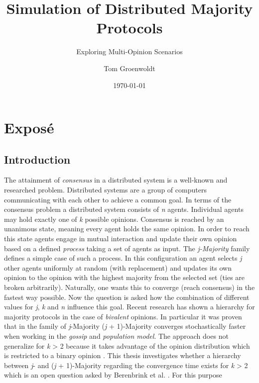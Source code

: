 \documentclass{thesis}
\title{Simulation of Distributed Majority Protocols}
\subtitle{Exploring Multi-Opinion Scenarios}
\author{Tom Groenwoldt}
\date{\today}
\begin{document}
\frontmatter
\maketitle
\tableofcontents
\mainmatter

\chapter{Exposé}

\section{Introduction}
The attainment of \textit{consensus} in a distributed system is a well-known and
researched problem. Distributed systems are a group of computers communicating
with each other to achieve a common goal. In terms of the consensus problem
a distributed system consists of \textit{n} agents. Individual agents may
hold exactly one of \textit{k} possible opinions. Consensus is reached by an
unanimous state, meaning every agent holds the same opinion. In order to reach
this state agents engage in mutual interaction and update their own opinion
based on a defined \textit{process} taking a set of agents as input.
\newline
The \textit{j-Majority} family defines a simple case of such a process. In
this configuration an agent selects \textit{j} other agents uniformly at random
(with replacement) and updates its own opinion to the opinion with the highest
majority from the selected set (ties are broken arbitrarily). Naturally, one
wants this to converge (reach consensus) in the fastest way possible. Now
the question is asked how the combination of different values for \textit{j},
\textit{k} and \textit{n} influence this goal.
\newline
Recent research has shown a hierarchy for majority protocols in the
case of \textit{bivalent} opinions. In particular it was proven that in the
family of \textit{j}-Majority (\textit{j} + 1)-Majority converges stochastically
faster when working in the \textit{gossip} and \textit{population model}.
The approach does not generalize for \textit{k} > 2 because it takes advantage
of the opinion distribution which is restricted to a binary opinion \cite{1}.
\newline
This thesis investigates whether a hierarchy between \textit{j}- and (\textit{j}
+ 1)-Majority regarding the convergence time exists for \textit{k} > 2 which
is an open question asked by Berenbrink et al. \cite{1}. For this purpose
\end{document}
